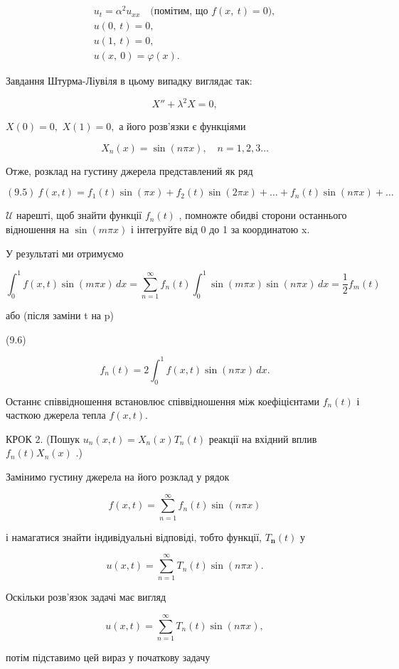\documentclass[
  ukrainian,
]{article}
\begin{document}
\[
\begin{array}{c} u_t = \alpha^2 u_{xx} \quad \text{(помітим, що } f(x, \ t) = 0), \\ u(0, \ t) = 0, \\ u(1, \ t) = 0, \\ u(x, \ 0) = \varphi(x). \end{array}
\]

Завдання Штурма-Ліувіля в цьому випадку виглядає так:

\[
X'' + \lambda^2 X = 0,
\]

\(X(0) = 0,\) \(X(1) = 0,\) а його розв'язки є функціями

\[
X_n(x) = \sin(n\pi x), \quad n = 1, 2, 3 \dots
\]

Отже, розклад на густину джерела представлений як ряд

\[
(9.5) \ f(x,t) = f_1(t) \sin(\pi x) + f_2(t) \sin(2\pi x) + \dots + f_n(t) \sin(n\pi x) + \dots
\]

\(\mathcal{U}\) нарешті, щоб знайти функції \(f_n(t)\) , помножте обидві
сторони останнього відношення на \(\sin(m\pi x)\) і інтегруйте від 0 до
1 за координатою x.

У результаті ми отримуємо

\[
\int_{0}^{1} f(x, t) \sin(m\pi x)\,dx = \sum_{n=1}^{\infty} f_{n}(t) \int_{0}^{1} \sin(m\pi x) \sin(n\pi x)\,dx = \frac{1}{2} f_{m}(t)
\]

або (після заміни t на p)

(9.6)

\[
f_{n}(t) = 2 \int_{0}^{1} f(x, t) \sin(n\pi x)\,dx.
\]

Останнє співвідношення встановлює співвідношення між коефіцієнтами
\(f_n(t)\) і часткою джерела тепла \(f(x, t)\).

КРОК 2. (Пошук \(u_n(x, t) = X_n(x) T_n(t)\) реакції на вхідний вплив
\(f_n(t) X_n(x)\) .)

Замінимо густину джерела на його розклад у рядок

\[
f(x, t) = \sum_{n=1}^{\infty} f_n(t) \sin(n\pi x)
\]

і намагатися знайти індивідуальні відповіді, тобто функції,
\(T_{\mathbf{n}}(t)\) у

\[
u(x, t) = \sum_{n=1}^{\infty} T_n(t) \sin(n\pi x).
\]

Оскільки розв'язок задачі має вигляд

\[
u(x, t) = \sum_{n=1}^{\infty} T_n(t) \sin(n\pi x),
\]

потім підставимо цей вираз у початкову задачу
\end{document}
